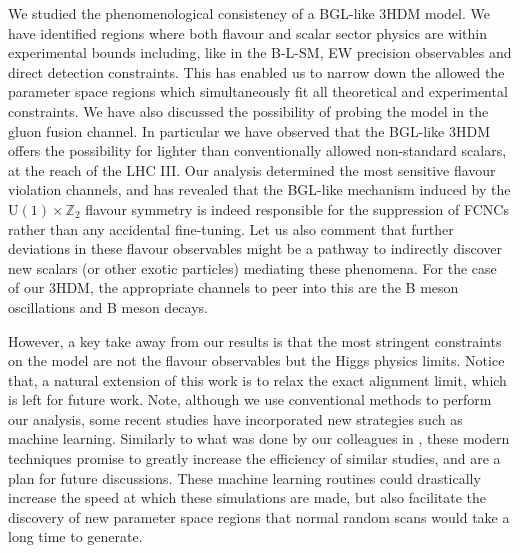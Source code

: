 \documentclass[10pt]{report}
\begin{document}

%
We studied the phenomenological consistency of a BGL-like 3HDM model. We have identified regions where both flavour and scalar sector physics are within experimental bounds including, like in the B-L-SM, EW precision observables and direct detection constraints.  
%
This has enabled us to narrow down the allowed  the parameter space regions which simultaneously fit all theoretical and experimental constraints. %
We have also discussed the possibility of probing the model in the gluon fusion channel. 
%
In particular we have observed that the BGL-like 3HDM offers the possibility for lighter than conventionally allowed non-standard scalars, at the reach of the LHC III.
%
Our analysis determined the most sensitive flavour violation channels, and has revealed that the BGL-like mechanism induced by the $\mathrm{U(1)}\times\mathbb{Z}_2$ flavour symmetry is indeed responsible for the suppression of FCNCs rather than any accidental fine-tuning. Let us also comment that further deviations in these flavour observables might be a pathway to indirectly discover new scalars (or other exotic particles) mediating these phenomena.  
%
For the case of our 3HDM, the appropriate channels to peer into this are the B meson oscillations and B meson decays.%

However, a key take away from our results is that the most stringent constraints on the model are not the flavour observables but the Higgs physics limits. 
%
Notice that, a natural extension of this work is to relax the exact alignment limit, which is left for future work. 
%
Note, although we use conventional methods to perform our analysis, some recent studies have incorporated new strategies such as machine learning. Similarly to what was done by our colleagues in \cite{freitas2020phenomenology}, these modern techniques promise to greatly increase the efficiency of similar studies, and are a plan for future discussions. 
%
%
These machine learning routines could drastically increase the speed at which these simulations are made, but also facilitate the discovery of new parameter space regions that normal random scans would take a long time to generate. 


%


\endgroup
\end{document}
